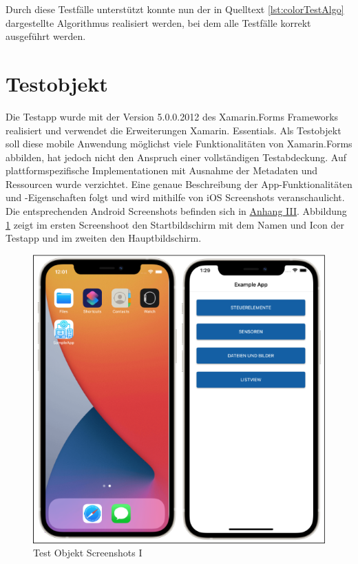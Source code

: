 

Durch diese Testfälle unterstützt konnte nun der in Quelltext \ref{lst:colorTestAlgo} dargestellte Algorithmus realisiert werden,  bei dem alle Testfälle korrekt ausgeführt werden.





\section{Testobjekt}
Die Testapp wurde mit der Version 5.0.0.2012 des Xamarin.Forms Frameworks realisiert und verwendet die Erweiterungen Xamarin. Essentials.  Als Testobjekt soll diese mobile Anwendung möglichst viele Funktionalitäten von Xamarin.Forms abbilden,  hat jedoch nicht den Anspruch einer vollständigen Testabdeckung.
Auf plattformspezifische Implementationen mit Ausnahme der Metadaten und Ressourcen wurde verzichtet.  Eine genaue Beschreibung der App-Funktionalitäten und -Eigenschaften folgt und wird mithilfe von iOS Screenshots veranschaulicht.  Die entsprechenden Android Screenshots befinden sich in \hyperref[chap:AnhangAndroidScreenshots]{Anhang III}.  Abbildung \ref{fig:TestObjectI} zeigt im ersten Screenshoot den Startbildschirm mit dem Namen und Icon der Testapp und im zweiten den Hauptbildschirm.  


\begin{figure}[!ht]
 \includegraphics[width=\textwidth,keepaspectratio]{Images/Screenshot/AppIconAndMenu.png}
 \caption{Test Objekt Screenshots I}
 \label{fig:TestObjectI}
\end{figure}


